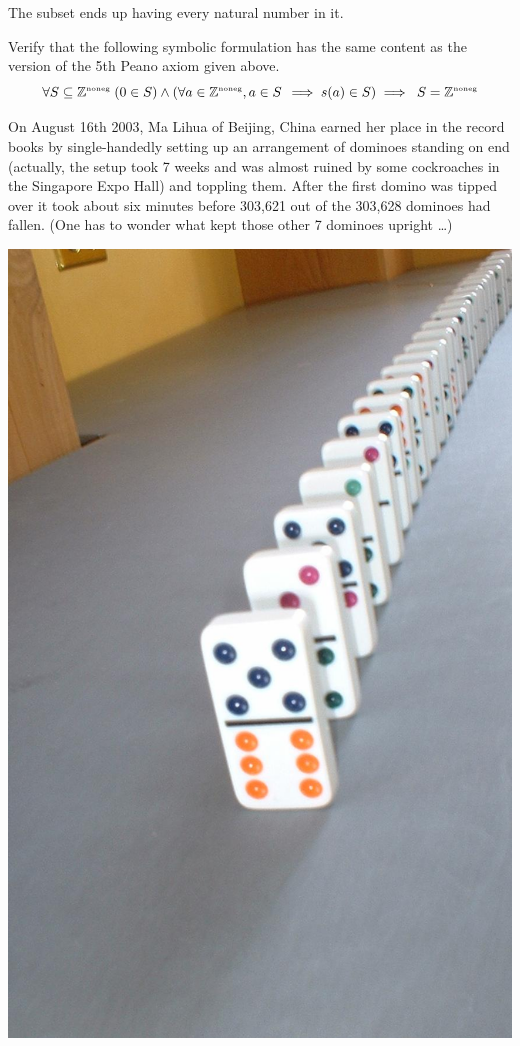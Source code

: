 The subset ends up having every natural number in it.

\begin{exer}
Verify that the following symbolic formulation has the same content
as the version of the 5th Peano axiom given above.
\[ \forall S \subseteq {\mathbb Z}^{\mbox{\tiny noneg}} \; ( 0 \in S ) \land (\forall a \in {\mathbb Z}^{\mbox{\tiny noneg}}, a \in S \, \implies s(a) \in S) \implies  \; S={\mathbb Z}^{\mbox{\tiny noneg}} \]

\end{exer}
\bigskip

On August 16th 2003, Ma Lihua of Beijing, China earned her place in the 
record books by single-handedly setting up an arrangement of dominoes 
standing on end (actually, the setup took 7 weeks and was almost ruined by
some cockroaches in the Singapore Expo Hall) and toppling them.  
After the first domino was tipped over it took about six minutes
before 303,621 out of the 303,628 dominoes had fallen. (One has to wonder 
what kept those other 7 dominoes upright \ldots)  

\begin{center}
\includegraphics[scale=.2]{photos/domino_row.jpg}
\end{center}

